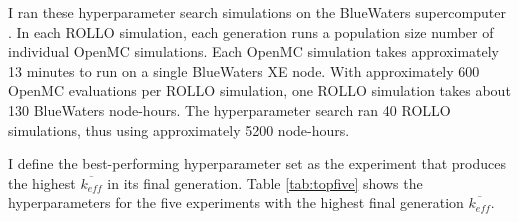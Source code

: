 I ran these hyperparameter search simulations on the BlueWaters supercomputer 
\cite{ncsa_about_2017}. 
In each \gls{ROLLO} simulation, each generation runs a population size number 
of individual OpenMC simulations. 
Each OpenMC simulation takes approximately 13 minutes to run on a single BlueWaters 
XE node. 
With approximately 600 OpenMC evaluations per \gls{ROLLO} simulation, one
\gls{ROLLO} simulation takes about 130 BlueWaters node-hours. 
The hyperparameter search ran 40 \gls{ROLLO} simulations, thus using approximately
5200 node-hours.

I define the best-performing hyperparameter set as the experiment that produces 
the highest $\overline{k_{eff}}$ in its final generation. 
Table \ref{tab:topfive} shows the hyperparameters for the five experiments 
with the highest final generation $\overline{k_{eff}}$.
\begin{table}[htbp]
    \centering
    \onehalfspacing
    \caption{Independent variables, $k_{eff}$ results, and hyperparameter values for 
    the five hyperparameter search experiments with the highest final generation 
    $\overline{k_{eff}}$.}
	\label{tab:topfive}
    \scriptsize
\end{table}
